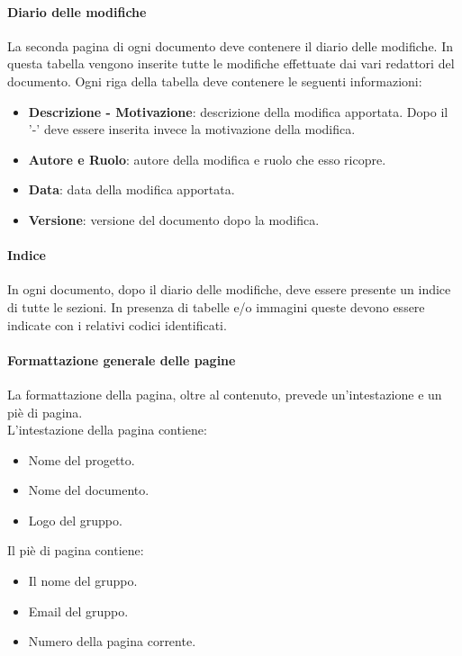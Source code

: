 \paragraph{Diario delle modifiche}
La seconda pagina di ogni documento deve contenere il diario delle modifiche. In questa tabella vengono inserite tutte le modifiche effettuate dai vari redattori del documento. Ogni
riga della tabella deve contenere le seguenti informazioni:
\begin{itemize}
  \item \textbf{Descrizione - Motivazione}: descrizione della modifica apportata. Dopo il '-' deve essere inserita invece la motivazione della modifica.
  \item \textbf{Autore e Ruolo}: autore della modifica e ruolo che esso ricopre.
  \item \textbf{Data}: data della modifica apportata.
  \item \textbf{Versione}: versione del documento dopo la modifica.
\end{itemize}

\paragraph{Indice}
In ogni documento, dopo il diario delle modifiche, deve essere presente un
indice di tutte le sezioni. In presenza di tabelle e/o immagini queste devono
essere indicate con i relativi codici identificati.

\paragraph{Formattazione generale delle pagine}
La formattazione della pagina, oltre al contenuto, prevede un'intestazione e un
piè di pagina. \\
L'intestazione della pagina contiene:
\begin{itemize}
  \item Nome del progetto.
  \item Nome del documento.
  \item Logo del gruppo.
\end{itemize}
Il piè di pagina contiene:
\begin{itemize}
  \item Il nome del gruppo.
  \item Email del gruppo.
  \item Numero della pagina corrente.
\end{itemize}

